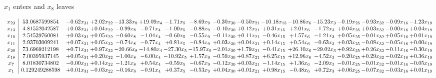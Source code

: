 \documentclass[9pt]{article}
\begin{document}
 $ x_{1} $ enters and $ x_{8} $ leaves 

 \[\begin{array}{c| c c@{\hskip 2pt} c@{\hskip 2pt} c@{\hskip 2pt} c@{\hskip 2pt} c@{\hskip 2pt} c@{\hskip 2pt} c@{\hskip 2pt} c@{\hskip 2pt} c@{\hskip 2pt} c@{\hskip 2pt} c@{\hskip 2pt} c@{\hskip 2pt} c@{\hskip 2pt} c@{\hskip 2pt} c@{\hskip 2pt} }
 x_{23}   &  53.0687599854 & -0.62 x_{31} & +  2.02 x_{22} & -13.33 x_{8} & + 19.09 x_{4} & -1.71 x_{5} & -8.69 x_{9} & -0.30 x_{30} & -0.50 x_{21} & -10.18 x_{15} & -10.86 x_{6} & -15.23 x_{3} & -0.19 x_{25} & -0.93 x_{32} & -0.09 x_{16} & -1.23 x_{19}\\
 x_{13}   &  4.81552042587 & +  0.03 x_{31} & +  0.04 x_{22} & -0.99 x_{8} & -0.71 x_{4} & -1.00 x_{5} & -0.88 x_{9} & -0.10 x_{30} & +  0.12 x_{21} & +  0.31 x_{15} & +  2.01 x_{6} & -1.72 x_{3} & +  0.04 x_{25} & +  0.03 x_{32} & -0.00 x_{16} & +  0.04 x_{19}\\
 x_{10}   &  2.54539760081 & +  0.03 x_{31} & +  0.05 x_{22} & -0.60 x_{8} & -1.04 x_{4} & -0.60 x_{5} & -0.55 x_{9} & -0.11 x_{30} & +  0.11 x_{21} & -0.46 x_{15} & +  1.57 x_{6} & -1.21 x_{3} & +  0.05 x_{25} & -0.01 x_{32} & +  0.05 x_{16} & +  0.01 x_{19}\\
 x_{11}   &  2.93703009241 & +  0.07 x_{31} & +  0.05 x_{22} & -0.74 x_{8} & -0.77 x_{4} & +  0.81 x_{5} & -0.84 x_{9} & +  0.03 x_{30} & +  0.04 x_{21} & +  0.14 x_{15} & +  0.54 x_{6} & -0.63 x_{3} & +  0.03 x_{25} & -0.08 x_{32} & -0.05 x_{16} & +  0.00 x_{19}\\
 x_{20}   &  73.6969212198 & +  0.71 x_{31} & +  0.97 x_{22} & -20.66 x_{8} & -14.80 x_{4} & -27.30 x_{5} & -15.97 x_{9} & -2.01 x_{30} & +  1.79 x_{21} & -0.41 x_{15} & + 26.10 x_{6} & -29.02 x_{3} & +  0.92 x_{25} & +  0.26 x_{32} & -0.11 x_{16} & -0.30 x_{19}\\
 x_{18}   &  7.00395937145 & +  0.05 x_{31} & +  0.20 x_{22} & -1.00 x_{8} & -6.00 x_{4} & -10.92 x_{5} & +  1.57 x_{9} & -0.59 x_{30} & +  0.87 x_{21} & +  6.25 x_{15} & + 12.96 x_{6} & -4.52 x_{3} & -0.20 x_{25} & +  0.29 x_{32} & -0.02 x_{16} & +  0.36 x_{19}\\
 x_{7}   &  8.01830734802 & -0.00 x_{31} & +  0.14 x_{22} & -1.21 x_{8} & +  0.54 x_{4} & -0.59 x_{5} & -0.67 x_{9} & -0.12 x_{30} & +  0.03 x_{21} & -1.14 x_{15} & +  1.36 x_{6} & -2.09 x_{3} & -0.01 x_{25} & -0.01 x_{32} & -0.01 x_{16} & -0.05 x_{19}\\
 x_{1}   &  0.129249288598 & +  0.01 x_{31} & -0.03 x_{22} & -0.16 x_{8} & -0.91 x_{4} & +  0.37 x_{5} & -0.53 x_{9} & +  0.04 x_{30} & +  0.01 x_{21} & +  0.98 x_{15} & -0.48 x_{6} & +  0.72 x_{3} & +  0.06 x_{25} & -0.07 x_{32} & -0.03 x_{16} & +  0.01 x_{19}\\

\end{array}\]
\end{document}
